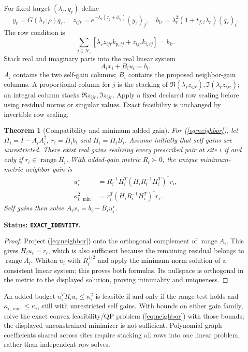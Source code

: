 \documentclass[11pt]{article}
\newtheorem{theorem}{Theorem}
\newcommand{\status}[1]{\par\smallskip\noindent\textbf{Status: \texttt{#1}.}\ }
\begin{document}
For fixed target $(\lambda_r,q_r)$ define
\[
 y_r=G(\lambda_r;\rho)q_r,\quad
 z_{ijr}=e^{-\lambda_r(\tau_j+d_{ij})}(y_r)_j,\quad
 b_{ir}=\lambda_r^2(1+t_{f,i}\lambda_r)(q_r)_i .
\]
The row condition is
\[
 \sum_{j\in\mathcal N_i}
  [\lambda_r z_{ijr}k_{p,ij}+z_{ijr}k_{i,ij}]=b_{ir}.
\]
Stack real and imaginary parts into the real linear system
\begin{equation}
 A_i x_i+B_i u_i=b_i. \label{eq:neighbor}
\end{equation}
$A_i$ contains the two self-gain columns; $B_i$ contains the proposed
neighbor-gain columns. A proportional column for $j$ is the stacking
of $\Re(\lambda_r z_{ijr}),\Im(\lambda_r z_{ijr})$; an integral column
stacks $\Re z_{ijr},\Im z_{ijr}$. Apply a fixed declared row scaling
before using residual norms or singular values. Exact feasibility is
unchanged by invertible row scaling.

\begin{theorem}[Compatibility and minimum added gain]
For (\ref{eq:neighbor}), let
$\Pi_i=I-A_iA_i^\dagger$, $r_i=\Pi_i b_i$ and $H_i=\Pi_i B_i$.
Assume initially that self gains are unrestricted.
There exist real gains realizing every prescribed pair at site $i$
if and only if $r_i\in\operatorname{range}H_i$.
With added-gain metric $R_i\succ0$, the unique minimum-metric neighbor
gain is
\begin{align}
 u_i^\star&=R_i^{-1}H_i^T
   (H_iR_i^{-1}H_i^T)^\dagger r_i, \label{eq:neighborgain}\\
 \kappa_{i,\min}^2&=
   r_i^T(H_iR_i^{-1}H_i^T)^\dagger r_i. \label{eq:neighborcost}
\end{align}
Self gains then solve $A_ix_i=b_i-B_iu_i^\star$.
\end{theorem}
\status{EXACT\_IDENTITY}
\begin{proof}
Project (\ref{eq:neighbor}) onto the orthogonal complement of
$\operatorname{range}A_i$. This gives $H_iu_i=r_i$, which is also
sufficient because the remaining residual belongs to
$\operatorname{range}A_i$. Whiten $u_i$ with $R_i^{1/2}$ and apply
the minimum-norm solution of a consistent linear system; this proves
both formulas. Its nullspace is orthogonal in the metric to the
displayed solution, proving minimality and uniqueness.
\end{proof}
An added budget $u_i^TR_iu_i\le\kappa_i^2$ is feasible if and only if
the range test holds and $\kappa_{i,\min}\le\kappa_i$, still with
unrestricted self gains. With bounds on either gain family, solve
the exact convex feasibility/QP problem (\ref{eq:neighbor}) with
those bounds; the displayed unconstrained minimizer is not sufficient.
Polynomial graph coefficients shared across sites require stacking
all rows into one linear problem, rather than independent row solves.
\end{document}
